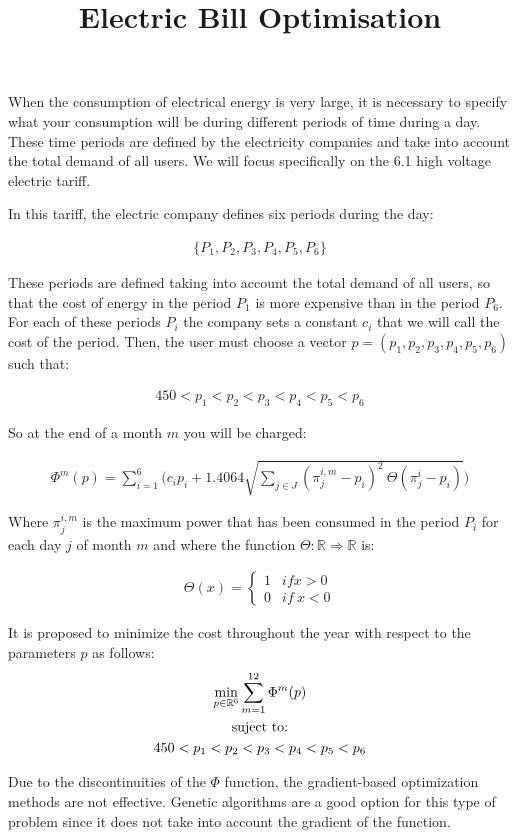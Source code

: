 \documentclass[]{article}
\title{Electric Bill Optimisation}
\begin{document}
    \maketitle

    When the consumption of electrical energy is very large, it is necessary to specify what your consumption will be during different periods of time during a day.
    These time periods are defined by the electricity companies and take into account the total demand of all users.
    We will focus specifically on the 6.1 high voltage electric tariff.
   
    In this tariff, the electric company defines six periods during the day:

    \begin{gather}
        \{P_1,P_2,P_3,P_4,P_5,P_6\}
    \end{gather}

    These periods are defined taking into account the total demand of all users, so that the cost of energy in the period $ P_1 $ is more expensive than in the period $ P_6 $. 
    For each of these periods $ P_i $ the company sets a constant $ c_i $ that we will call the cost of the period.    
    Then, the user must choose a vector $ p = (p_1, p_2, p_3, p_4, p_5, p_6) $ such that:

    \begin{gather}
        450 < p_1 < p_2 < p_3 < p_4 < p_5 < p_6
    \end{gather}

  
    So at the end of a month $m$ you will be charged:

    \begin{gather}
        \Phi^m(p) = \sum_{i=1}^6 \Bigg( c_ip_i + 1.4064 \sqrt{\sum_{j \in J} (\pi_j^{i,m} - p_i)^2 \ \Theta(\pi_j^i - p_i)}\Bigg)
    \end{gather}

Where $ \pi_j ^{i,m} $ is the maximum power that has been consumed in the period $ P_i $ for each day $ j $ of month $m$ and where the function $\Theta: \mathbb{R} \Rightarrow \mathbb {R}$ is:

    \begin{gather}
        \Theta(x) = \begin{cases}
            1 & if  x>0 \\
            0 & if \ x<0
        \end{cases}
    \end{gather}

    It is proposed to minimize the cost throughout the year with respect to the parameters $ p $ as follows:
    \begin{gather}
        \min_{p\in\mathbb{R}^6} \sum_{m=1}^{12} \Phi^m(p) \\ 
        \notag \text{suject to:} \\
        \notag 450 < p_1 < p_2 < p_3 < p_4 < p_5 < p_6
    \end{gather}

    Due to the discontinuities of the $ \Phi $ function, the gradient-based optimization methods are not effective. Genetic algorithms are a good option for this type of problem since it does not take into account the gradient of the function.
    
\end{document}
